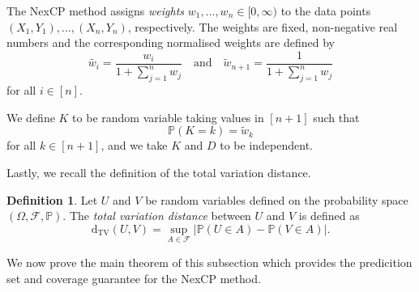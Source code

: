 \documentclass[11pt, titlepage]{article} %
\newcommand{\R}{\mathrm}
\newcommand{\Prob}[1]{\mathbb{P}\left( #1 \right)}
\numberwithin{equation}{section}
\theoremstyle{definition}
\newtheorem{definition}{Definition}
\numberwithin{theorem}{section}
\numberwithin{lemma}{section}
\numberwithin{corollary}{section}
\numberwithin{proposition}{section}
\numberwithin{definition}{section}
\numberwithin{remark}{section}
\begin{document}
\noindent
The NexCP method assigns \textit{weights} \(w_1, \ldots, w_{n} \in [0, \infty)\) to the data points \((X_1, Y_1), \ldots, (X_n, Y_n)\), respectively. The weights are fixed, non-negative real numbers and the corresponding normalised weights are defined by \begin{equation}
    \tilde{w_i} = \frac{w_i}{1+\sum_{j=1}^n w_j} \quad \mathrm{and} \quad \tilde{w}_{n+1} = \frac{1}{1+\sum_{j=1}^n w_j}
\label{eqn:nexCP_weights_defn}
\end{equation} for all \(i \in [n]\). \vskip5pt

\noindent
We define \(K\) to be random variable taking values in \([n+1]\) such that \begin{equation}
    \Prob{K = k} = \tilde{w}_k
\label{eqn:nexCP_K_defn}
\end{equation} for all \(k \in [n+1]\), and we take \(K\) and \(D\) to be independent. \vskip5pt

\noindent
Lastly, we recall the definition of the total variation distance.

\begin{definition}
    Let \(U\) and \(V\) be random variables defined on the probability space \((\Omega, \mathcal{F}, \mathbb{P})\). The \textit{total variation distance} between \(U\) and \(V\) is defined as \[\R{d_{TV}}(U,V) = \sup_{A \in \mathcal{F}} | \Prob{U \in A} - \Prob{V \in A}| .\] 
\label{defn:TV_distance}
\end{definition}

\noindent
We now prove the main theorem of this subsection which provides the predicition set and coverage guarantee for the NexCP method.
\end{document}
